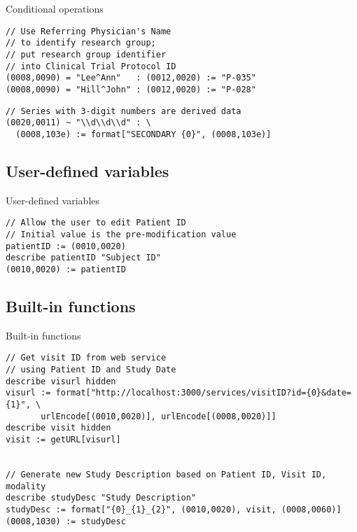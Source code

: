 \documentclass{beamer}  %
\begin{document}
\begin{frame}[fragile]{Conditional operations}

\begin{verbatim}
// Use Referring Physician's Name
// to identify research group;
// put research group identifier
// into Clinical Trial Protocol ID
(0008,0090) = "Lee^Ann"   : (0012,0020) := "P-035"
(0008,0090) = "Hill^John" : (0012,0020) := "P-028"
\end{verbatim}

\pause
\begin{verbatim}
// Series with 3-digit numbers are derived data
(0020,0011) ~ "\\d\\d\\d" : \
  (0008,103e) := format["SECONDARY {0}", (0008,103e)]
\end{verbatim}

\end{frame}

\subsection{User-defined variables}
\begin{frame}[fragile]{User-defined variables}

\begin{verbatim}
// Allow the user to edit Patient ID
// Initial value is the pre-modification value
patientID := (0010,0020)
describe patientID "Subject ID"
(0010,0020) := patientID
\end{verbatim}

\end{frame}

\subsection{Built-in functions}
\begin{frame}[fragile]{Built-in functions}
\scriptsize
\begin{verbatim}
// Get visit ID from web service
// using Patient ID and Study Date
describe visurl hidden
visurl := format["http://localhost:3000/services/visitID?id={0}&date={1}", \
       urlEncode[(0010,0020)], urlEncode[(0008,0020)]]
describe visit hidden
visit := getURL[visurl]


// Generate new Study Description based on Patient ID, Visit ID, modality
describe studyDesc "Study Description"
studyDesc := format["{0}_{1}_{2}", (0010,0020), visit, (0008,0060)]
(0008,1030) := studyDesc
\end{verbatim}
\end{frame}
\end{document}
